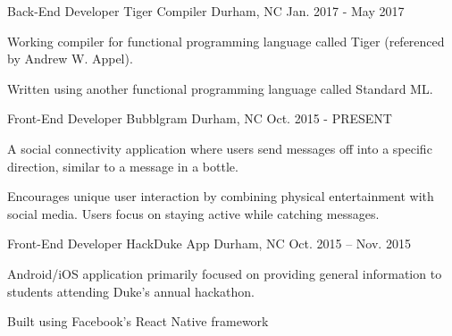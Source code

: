 \begin{cventries}
  \cventry
    {Back-End Developer}
    {Tiger Compiler}
    {Durham, NC}
    {Jan. 2017 - May 2017}
    {
      \begin{cvitems}
        \item {Working compiler for functional programming language called Tiger (referenced by Andrew W. Appel).}
        \item {Written using another functional programming language called Standard ML.}
      \end{cvitems}
    }
  \cventry
    {Front-End Developer}
    {Bubblgram}
    {Durham, NC}
    {Oct. 2015 - PRESENT}
    {
      \begin{cvitems}
        \item {A social connectivity application where users send messages off into a specific direction, similar to a message in a bottle. }
        \item {Encourages unique user interaction by combining physical entertainment with social media. Users focus on staying active while catching messages.}
      \end{cvitems}
    }
  \cventry
    {Front-End Developer}
    {HackDuke App}
    {Durham, NC}
    {Oct. 2015 -- Nov. 2015}
    {
      \begin{cvitems}
        \item {Android/iOS application primarily focused on providing general information to students attending Duke's annual hackathon.}
        \item{Built using Facebook's React Native framework}
      \end{cvitems}
    }
\end{cventries}
